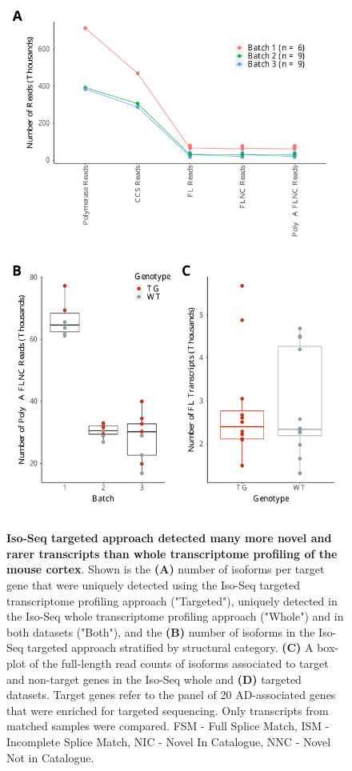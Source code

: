 \begin{figure}[!htp]
	\centering
	\includegraphics[page=3,trim={0 1.5cm 0 0cm},clip,scale = 0.50]{Figures/TargetedTranscriptome.pdf}
	\label{fig:targeted_vs_whole}
	\captionsetup{width=0.95\textwidth}
	\caption[Comparison of whole transcriptome vs targeted Iso-Seq transcriptome profiling]%
	{\textbf{Iso-Seq targeted approach detected many more novel and rarer transcripts than whole transcriptome profiling of the mouse cortex}. Shown is the \textbf{(A)} number of isoforms per target gene that were uniquely detected using the Iso-Seq targeted transcriptome profiling approach ("Targeted"), uniquely detected in the Iso-Seq whole transcriptome profiling approach ("Whole") and in both datasets ("Both"), and the \textbf{(B)} number of isoforms in the Iso-Seq targeted approach stratified by structural category. \textbf{(C)} A box-plot of the full-length read counts of isoforms associated to target and non-target genes in the Iso-Seq whole and \textbf{(D)} targeted datasets. Target genes refer to the panel of 20 AD-associated genes that were enriched for targeted sequencing. Only transcripts from matched samples were compared. FSM - Full Splice Match, ISM - Incomplete Splice Match, NIC - Novel In Catalogue, NNC - Novel Not in Catalogue.}
\end{figure}

